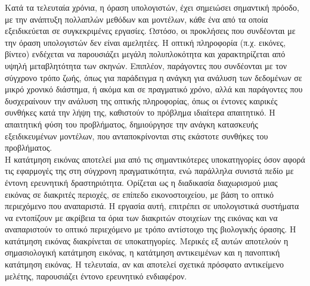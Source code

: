 \documentclass[12pt]{article}
\numberwithin{equation}{section}
\begin{document}
Κατά τα τελευταία χρόνια, η όραση υπολογιστών, έχει σημειώσει σημαντική πρόοδο, με την ανάπτυξη πολλαπλών μεθόδων και μοντέλων, κάθε ένα από τα οποία εξειδικεύεται σε συγκεκριμένες εργασίες. Ωστόσο, οι προκλήσεις που συνδέονται με την όραση υπολογιστών δεν είναι αμελητέες. Η οπτική πληροφορία (π.χ. εικόνες, βίντεο) ενδέχεται να παρουσιάζει μεγάλη πολυπλοκότητα και χαρακτηρίζεται από υψηλή μεταβλητότητα των σκηνών. Επιπλέον, παράγοντες που συνδέονται με τον σύγχρονο τρόπο ζωής, όπως για παράδειγμα η ανάγκη για ανάλυση των δεδομένων σε μικρό χρονικό διάστημα, ή ακόμα και σε πραγματικό χρόνο, αλλά και παράγοντες που δυσχεραίνουν την ανάλυση της οπτικής πληροφορίας, όπως οι έντονες καιρικές συνθήκες κατά την λήψη της, καθιστούν το πρόβλημα ιδιαίτερα απαιτητικό. Η απαιτητική φύση του προβλήματος, δημιούργησε την ανάγκη κατασκευής εξειδικευμένων μοντέλων, που ανταποκρίνονται στις εκάστοτε συνθήκες του προβλήματος. \\

Η κατάτμηση εικόνας αποτελεί μια από τις σημαντικότερες υποκατηγορίες όσον αφορά τις εφαρμογές της στη σύγχρονη πραγματικότητα, ενώ παράλληλα συνιστά πεδίο με έντονη ερευνητική δραστηριότητα. Ορίζεται ως η διαδικασία διαχωρισμού μιας εικόνας σε διακριτές περιοχές, σε επίπεδο εικονοστοιχείου, με βάση το οπτικό περιεχόμενο που αναπαριστά. Η εργασία αυτή, επιτρέπει σε υπολογιστικά συστήματα να εντοπίζουν με ακρίβεια τα όρια των διακριτών στοιχείων της εικόνας και να αναπαριστούν το οπτικό περιεχόμενο με τρόπο αντίστοιχο της βιολογικής όρασης. Η κατάτμηση εικόνας διακρίνεται σε υποκατηγορίες. Μερικές εξ αυτών αποτελούν η σημασιολογική κατάτμηση εικόνας, η κατάτμηση αντικειμένων και η πανοπτική κατάτμηση εικόνας. Η τελευταία, αν και αποτελεί σχετικά πρόσφατο αντικείμενο μελέτης, παρουσιάζει έντονο ερευνητικό ενδιαφέρον.\\
\end{document}
